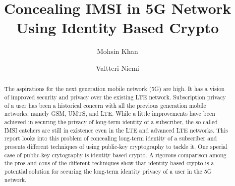 \documentclass[lnicst,sechang,a4paper]{svmultln}
\begin{document}
\mainmatter  %

\title{Concealing IMSI in 5G Network Using Identity Based Crypto}


%
%
\author{Mohsin Khan%
\and Valtteri Niemi}  %


%
%

\maketitle


\begin{abstract}
The aspirations for the next generation mobile network (5G) are high. It has a vision of improved security and privacy over the existing LTE network. Subscription privacy of a user has been a historical concern with all the previous generation mobile networks, namely GSM, UMTS, and LTE. While a little improvements have been achieved in securing the privacy of long-term identity of a subscriber, the so called IMSI catchers are still in existence even in the LTE and advanced LTE networks. This report looks into this problem of concealing long-term identity of a subscriber and presents different techniques of using public-key cryptography to tackle it. One special case of public-key crytography is identity based crypto. A rigorous comparison among the pros and cons of the different techniques show that identity based crypto is a potential solution for securing the long-term identity privacy of a user in the 5G network.
\end{abstract}
\end{document}
